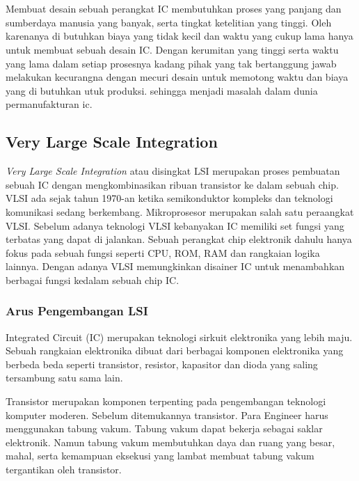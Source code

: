 \chapter{\babDua}
Membuat desain sebuah perangkat IC membutuhkan proses yang panjang dan sumberdaya manusia yang banyak, serta tingkat ketelitian yang tinggi. Oleh karenanya di butuhkan biaya yang tidak kecil dan waktu yang cukup lama hanya untuk membuat sebuah desain IC. Dengan kerumitan yang tinggi serta waktu yang lama dalam setiap prosesnya kadang pihak yang tak bertanggung jawab melakukan kecurangna dengan mecuri desain untuk memotong waktu dan biaya yang di butuhkan utuk produksi. sehingga menjadi masalah dalam dunia permanufakturan ic. \cite{Azriel2017, Basak2017, Bidmeshki2017, Chen2017, Chen2017a, Dellosa2017, Guo2017, Jin2017, Lin2017, Matters2017, Matters2017a, Mohanty2017, Mohanty2017a, Ngo2017, Ngo2017a, Of2017, Sengupta2017a, Sengupta2017b, Sengupta2017, Tsai2017, Veeranna2017, Wehlack2017, Yasin2017, Zhang2017a, Zhang2017, Zhang2017b}

\section{Very Large Scale Integration}
\textit{Very Large Scale Integration} atau disingkat LSI merupakan proses pembuatan sebuah IC dengan mengkombinasikan ribuan transistor ke dalam sebuah chip. VLSI ada sejak tahun 1970-an ketika semikonduktor kompleks dan teknologi komunikasi sedang berkembang. Mikroprosesor merupakan salah satu peraangkat VLSI. Sebelum adanya teknologi VLSI kebanyakan IC memiliki set fungsi yang terbatas yang dapat di jalankan. Sebuah perangkat chip elektronik dahulu hanya fokus pada sebuah fungsi seperti CPU, ROM, RAM dan rangkaian logika lainnya. Dengan adanya VLSI memungkinkan disainer IC untuk menambahkan berbagai fungsi kedalam sebuah chip IC. \cite{vlsi.hist} 

\subsection{Arus Pengembangan LSI}
Integrated Circuit (IC) merupakan teknologi sirkuit elektronika yang lebih maju. Sebuah rangkaian elektronika dibuat dari berbagai komponen elektronika yang berbeda beda seperti transistor, resistor, kapasitor dan dioda yang saling tersambung satu sama lain. \cite{vlsi.hist}

Transistor merupakan komponen terpenting pada pengembangan teknologi komputer moderen. Sebelum ditemukannya transistor. Para Engineer harus menggunakan tabung vakum. Tabung vakum dapat bekerja sebagai saklar elektronik. Namun tabung vakum membutuhkan daya dan ruang yang besar, mahal, serta kemampuan eksekusi yang lambat membuat tabung vakum tergantikan oleh transistor.

